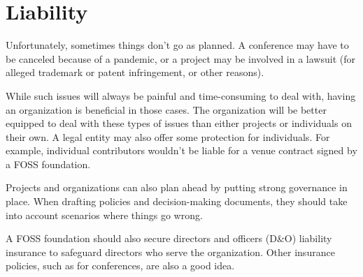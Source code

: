 


\chapter{Liability}

Unfortunately, sometimes things don't go as planned.  A conference may have to be canceled because of a pandemic, or a project may be involved in a lawsuit (for alleged trademark or patent infringement, or other reasons).

While such issues will always be painful and time-consuming to deal with, having an organization is beneficial in those cases.  The organization will be better equipped to deal with these types of issues than either projects or individuals on their own.  A legal entity may also offer some protection for individuals.  For example, individual contributors wouldn't be liable for a venue contract signed by a FOSS foundation.

Projects and organizations can also plan ahead by putting strong governance in place.  When drafting policies and decision-making documents, they should take into account scenarios where things go wrong.

A FOSS foundation should also secure directors and officers (D\&O) liability insurance to safeguard directors who serve the organization.  Other insurance policies, such as for conferences, are also a good idea.

